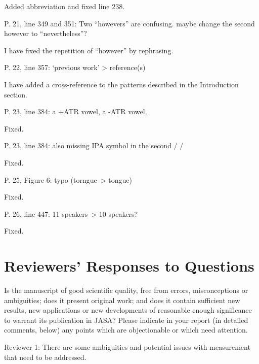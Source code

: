 \documentclass[]{article}
\begin{document}
\color{plum}

Added abbreviation and fixed line 238. \color{black}

P. 21, line 349 and 351: Two ``howevers'' are confusing. maybe change
the second however to ``nevertheless''?

\color{plum}

I have fixed the repetition of ``however'' by rephrasing. \color{black}

P. 22, line 357: `previous work' \textgreater{} reference(s)

\color{plum}

I have added a cross-reference to the patterns described in the
Introduction section. \color{black}

P. 23, line 384: a +ATR vowel, a -ATR vowel,

\color{plum}

Fixed. \color{black}

P. 23, line 384: also missing IPA symbol in the second / /

\color{plum}

Fixed. \color{black}

P. 25, Figure 6: typo (torngue--\textgreater{} tongue)

\color{plum}

Fixed. \color{black}

P. 26, line 447: 11 speakers--\textgreater{} 10 speakers?

\color{plum}

Fixed. \color{black}

\hypertarget{reviewers-responses-to-questions}{%
\section{Reviewers' Responses to
Questions}\label{reviewers-responses-to-questions}}

Is the manuscript of good scientific quality, free from errors,
misconceptions or ambiguities; does it present original work; and does
it contain sufficient new results, new applications or new developments
of reasonable enough significance to warrant its publication in JASA?
Please indicate in your report (in detailed comments, below) any points
which are objectionable or which need attention.

Reviewer 1: There are some ambiguities and potential issues with
measurement that need to be addressed.
\end{document}
